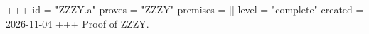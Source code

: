 +++
id = "ZZZY.a"
proves = "ZZZY"
premises = []
level = "complete"
created = 2026-11-04
+++
Proof of ZZZY.
